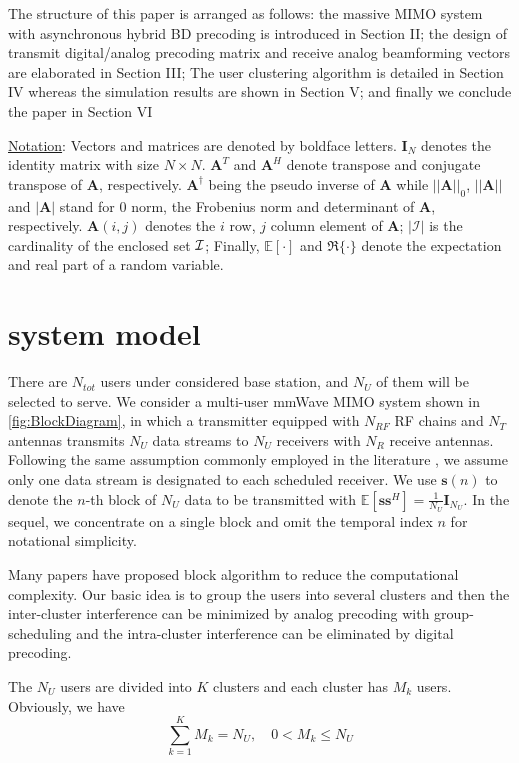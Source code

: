 \documentclass[conference]{IEEEtran}
\begin{document}
The structure of this paper is arranged as follows: the massive MIMO system with asynchronous hybrid BD precoding is introduced in Section II; the design of transmit digital/analog precoding matrix and receive analog beamforming vectors are elaborated in Section III; The user clustering algorithm is detailed in Section IV whereas the simulation results are shown in Section V; and finally we conclude the paper in Section VI

\underline{Notation}: Vectors and matrices are denoted by boldface letters. $\bm{I}_N$ denotes the identity matrix with size $N\times N$. ${\bm A}^T$ and ${\bm A}^H$ denote transpose and conjugate transpose of ${\bm A}$, respectively. $\bm{A}^\dagger$ being the pseudo inverse of $\bm{A}$ while $||\bm{A}||_0$, $||\bm{A}|| $ and $|\bm{A}|$ stand for $0$ norm, the Frobenius norm and determinant of ${\bm A}$, respectively. $\bm{A}(i,j)$ denotes the $i$ row, $j$ column element of ${\bm A}$; $|\mathcal{I}|$ is the cardinality of the enclosed set ${\cal I}$; Finally, $\mathbb{E}[\cdot] $ and $\Re\{\cdot\}$ denote the expectation and real part of a random variable.

\section{system model}
There are $N_{tot}$ users under considered base station, and $N_U$ of them will be selected to serve. We consider a multi-user mmWave MIMO system shown in \figurename{ \ref{fig:BlockDiagram}}, in which a transmitter equipped with $N_{RF}$ RF chains and $N_T$ antennas transmits $N_U$ data streams to $N_U$ receivers with $N_R$ receive antennas. Following the same assumption commonly employed in the literature \cite{alkhateeb2015limited}, we assume only one data stream is designated to each scheduled receiver. We use ${\bm s}(n)$ to denote the $n$-th block of $N_U$ data to be transmitted with $\mathbb{E}\left[\bm{ss}^H\right]=\frac{1}{N_U}\bm{I}_{N_U}$. In the sequel, we concentrate on a single block and omit the temporal index $n$ for notational simplicity.

Many papers have proposed block algorithm to reduce the computational complexity. Our basic idea is to group the users into several clusters and then the inter-cluster interference can be minimized by analog precoding with group-scheduling and the intra-cluster interference can be eliminated by digital precoding.

The $N_U$ users are divided into $K$ clusters and each cluster has $M_k$ users. Obviously, we have
\begin{equation}
	\sum_{k=1}^{K} M_k = N_U, \quad 0< M_k\leq N_U
\end{equation}
\end{document}
